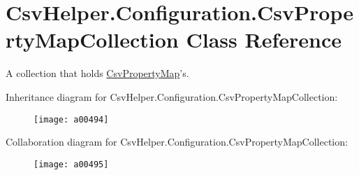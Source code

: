 \hypertarget{a00073}{\section{Csv\-Helper.\-Configuration.\-Csv\-Property\-Map\-Collection Class Reference}
\label{a00073}
}


A collection that holds \hyperlink{a00072}{Csv\-Property\-Map}'s.  




Inheritance diagram for Csv\-Helper.\-Configuration.\-Csv\-Property\-Map\-Collection\-:
\nopagebreak
\begin{figure}[H]
\begin{center}
\leavevmode
\texttt{[image: a00494]}
\end{center}
\end{figure}


Collaboration diagram for Csv\-Helper.\-Configuration.\-Csv\-Property\-Map\-Collection\-:
\nopagebreak
\begin{figure}[H]
\begin{center}
\leavevmode
\texttt{[image: a00495]}
\end{center}
\end{figure}
